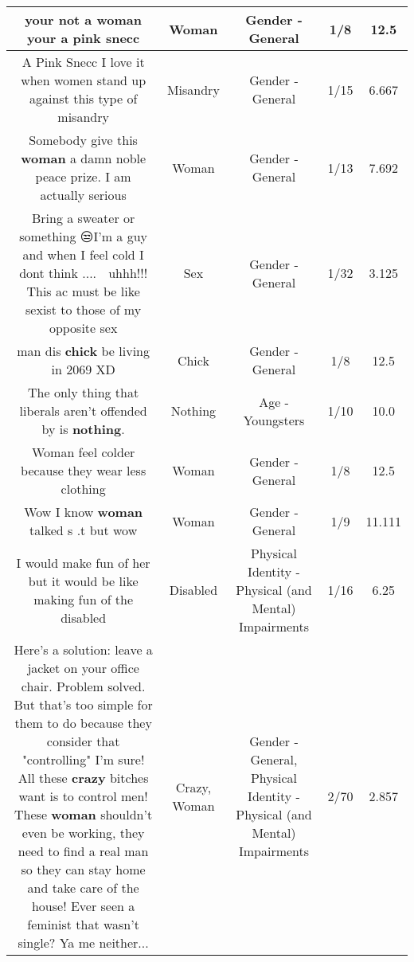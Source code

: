 \documentclass[11pt]{article}
\newlength\mylength
\begin{document}
\begin{center}
\begin{longtable}{|C{.65\mylength}|C{.30\mylength}|C{.12\mylength}|C{.12\mylength}|C{.12\mylength}|}
  \small your not a \textbf{woman} your a pink snecc\normalsize   & Woman & Gender - General & 1/8 & 12.5 \\  \hline
  \small A Pink Snecc I love it when women stand up against this type of misandry\normalsize   & Misandry & Gender - General & 1/15 & 6.667 \\  \hline
  \small Somebody give this \textbf{woman} a damn noble peace prize.      I am actually serious\normalsize   & Woman & Gender - General & 1/13 & 7.692 \\  \hline
  \small Bring a sweater or something 😒I'm a guy and when I feel cold I dont think .... 🤯 uhhh!!! This ac must be like sexist to those of my opposite sex\normalsize   & Sex & Gender - General & 1/32 & 3.125 \\  \hline
  \small man dis \textbf{chick} be living in 2069 XD\normalsize   & Chick & Gender - General & 1/8 & 12.5 \\  \hline
  \small The only thing that liberals aren't offended by is \textbf{nothing}.\normalsize   & Nothing & Age - Youngsters & 1/10 & 10.0 \\  \hline
  \small Woman feel colder because they wear less clothing\normalsize   & Woman & Gender - General & 1/8 & 12.5 \\  \hline
  \small Wow I know \textbf{woman} talked s .t but wow\normalsize   & Woman & Gender - General & 1/9 & 11.111 \\  \hline
  \small I would make fun of her but it would be like making fun of the disabled\normalsize   & Disabled & Physical Identity - Physical (and Mental) Impairments & 1/16 & 6.25 \\  \hline
  \small Here's a solution: leave a jacket on your office chair. Problem solved. But that's too simple for them to do because they consider that "controlling" I'm sure! All these \textbf{crazy} bitches want is to control men! These \textbf{woman} shouldn't even be working, they need to find a real man so they can stay home and take care of the house! Ever seen a feminist that wasn't single? Ya me neither...\normalsize   & Crazy, Woman & Gender - General, Physical Identity - Physical (and Mental) Impairments & 2/70 & 2.857 \\  \hline

\end{longtable}
\end{center}
\end{document}
